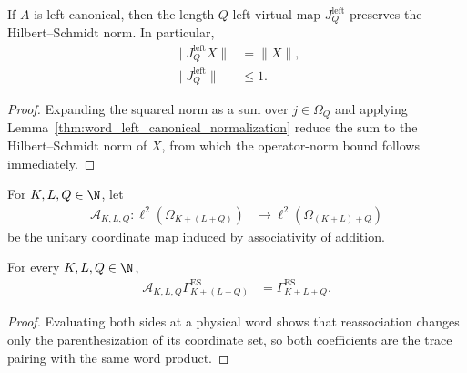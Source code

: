 \begin{lemma}
    \label{thm:whole_increment_left_virtual_norm}
    \leanok
    If $A$ is left-canonical, then the length-$Q$ left virtual map
    $J_Q^{\mathrm{left}}$ preserves the Hilbert--Schmidt norm.  In particular,
    \begin{align}
        \lVert J_Q^{\mathrm{left}}X\rVert & =\lVert X\rVert, \\
        \lVert J_Q^{\mathrm{left}}\rVert  & \leq1.
    \end{align}
\end{lemma}

\begin{proof}
    \leanok
    Expanding the squared norm as a sum over $j\in\Omega_Q$ and applying
    Lemma~\ref{thm:word_left_canonical_normalization} reduce the sum to the
    Hilbert--Schmidt norm of $X$, from which the operator-norm bound follows
    immediately.
\end{proof}

\begin{definition}
    \label{def:whole_increment_physical_reassociation}
    \leanok
    For $K,L,Q\in\N$, let
    \begin{align}
        \mathscr A_{K,L,Q}\colon
        \ell^2(\Omega_{K+(L+Q)}) & \longrightarrow
        \ell^2(\Omega_{(K+L)+Q})
    \end{align}
    be the unitary coordinate map induced by associativity of addition.
\end{definition}

\begin{lemma}
    \label{thm:whole_increment_ground_space_reassociation}
    \leanok
    For every $K,L,Q\in\N$,
    \begin{align}
        \mathscr A_{K,L,Q}\Gamma_{K+(L+Q)}^{\mathrm{ES}}
         & =\Gamma_{K+L+Q}^{\mathrm{ES}}.
    \end{align}
\end{lemma}

\begin{proof}
    \leanok
    Evaluating both sides at a physical word shows that reassociation changes
    only the parenthesization of its coordinate set, so both coefficients are
    the trace pairing with the same word product.
\end{proof}

